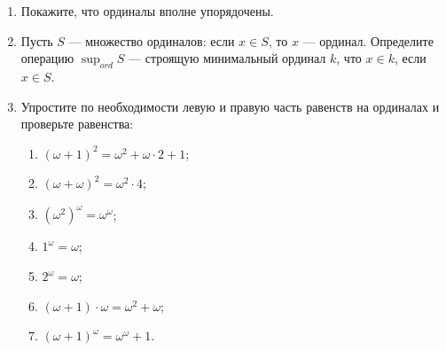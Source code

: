 \documentclass[10pt,a4paper,oneside]{article}
\begin{document}
\begin{enumerate}
\item Покажите, что ординалы вполне упорядочены.

\item Пусть $S$ --- множество ординалов: если $x \in S$, то $x$ --- ординал.
Определите операцию $\sup_{ord} S$ --- строящую минимальный ординал $k$, что
$x\in k$, если $x \in S$.

\item Упростите по необходимости левую и правую часть равенств на ординалах и проверьте равенства:
\begin{enumerate}
\item $(\omega+1)^2 = \omega^2 + \omega\cdot 2 + 1$;
\item $(\omega+\omega)^2 = \omega^2 \cdot 4$;
\item $(\omega^2)^\omega = \omega^\omega$;
\item $1^\omega = \omega$;
\item $2^\omega = \omega$;
\item $(\omega+1)\cdot\omega = \omega^2 + \omega$;
\item $(\omega+1)^\omega = \omega^\omega + 1$.
\end{enumerate}
\end{enumerate}


%
\end{document}
